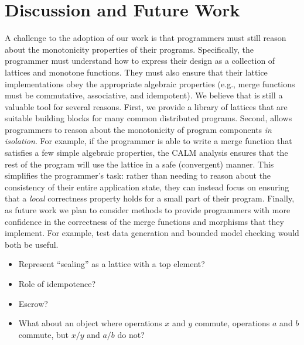 \section{Discussion and Future Work}
\label{sec:discussion}


A challenge to the adoption of our work is that programmers must still reason
about the monotonicity properties of their programs. Specifically, the
programmer must understand how to express their design as a collection of
lattices and monotone functions. They must also ensure that their lattice
implementations obey the appropriate algebraic properties (e.g., merge functions
must be commutative, associative, and idempotent). We believe that \lang is
still a valuable tool for several reasons. First, we provide a library of
lattices that are suitable building blocks for many common distributed
programs. Second, \lang allows programmers to reason about the monotonicity of
program components \emph{in isolation}. For example, if the programmer is able
to write a merge function that satisfies a few simple algebraic properties, the
CALM analysis ensures that the rest of the program will use the lattice in a
safe (convergent) manner. This simplifies the programmer's task: rather than
needing to reason about the consistency of their entire application state, they
can instead focus on ensuring that a \emph{local} correctness property holds for
a small part of their program. Finally, as future work we plan to consider
methods to provide programmers with more confidence in the correctness of the
merge functions and morphisms that they implement. For example, test data
generation and bounded model checking would both be useful.

\begin{itemize}
\item
  Represent ``sealing'' as a lattice with a top element?
\item 
  Role of idempotence?
\item
  Escrow?
\item 
  What about an object where operations $x$ and $y$ commute, operations $a$ and
  $b$ commute, but $x/y$ and $a/b$ do not?
\end{itemize}
